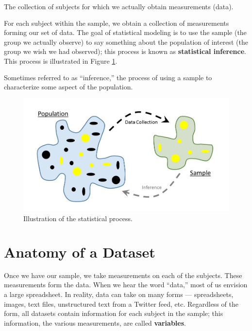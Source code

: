 \documentclass[]{book}
\theoremstyle{definition}
\theoremstyle{definition}
\theoremstyle{definition}
\theoremstyle{remark}
\let\BeginKnitrBlock\begin \let\EndKnitrBlock\end
\begin{document}
\BeginKnitrBlock{definition}[Sample]
\protect\hypertarget{def:defn-sample}{}{\label{def:defn-sample}
{} }The collection of subjects for which we
actually obtain measurements (data).
\EndKnitrBlock{definition}

For each subject within the sample, we obtain a collection of
measurements forming our set of data. The goal of statistical modeling
is to use the sample (the group we actually observe) to say something
about the population of interest (the group we wish we had observed);
this process is known as \textbf{statistical inference}. This process is
illustrated in Figure \ref{fig:basics-statistical-process}.

\BeginKnitrBlock{definition}[Statistical Inference]
\protect\hypertarget{def:defn-inference}{}{\label{def:defn-inference}
{} }Sometimes referred to as
``inference,'' the process of using a sample to characterize some aspect
of the population.
\EndKnitrBlock{definition}

\begin{figure}

{\centering \includegraphics[width=0.8\linewidth]{images/Basics-Stat-Process} 

}

\caption{Illustration of the statistical process.}\label{fig:basics-statistical-process}
\end{figure}

\section{Anatomy of a Dataset}\label{anatomy-of-a-dataset}

Once we have our sample, we take measurements on each of the subjects.
These measurements form the data. When we hear the word ``data,'' most
of us envision a large spreadsheet. In reality, data can take on many
forms --- spreadsheets, images, text files, unstructured text from a
Twitter feed, etc. Regardless of the form, all datasets contain
information for each subject in the sample; this information, the
various measurements, are called \textbf{variables}.
\end{document}
